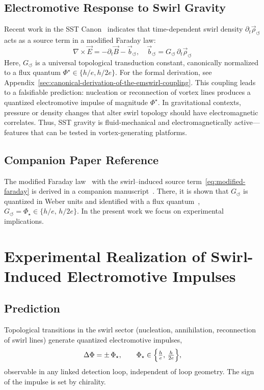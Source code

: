 \documentclass[11pt]{article}
\begin{document}
    \subsection{Electromotive Response to Swirl Gravity}
        Recent work in the SST Canon~\cite{Iskandarani2025EMG} indicates that time-dependent swirl density $\partial_t \vec{\rho}_{\circlearrowleft}$ acts as a source term in a modified Faraday law:
        \[
            \nabla \times \vec{E} = -\partial_t \vec{B} - \vec{b}_{\circlearrowleft}, \quad \vec{b}_{\circlearrowleft} = G_{\circlearrowleft} \, \partial_t \vec{\rho}_{\circlearrowleft}\label{eq:modified-faraday}
        \]
        Here, $G_{\circlearrowleft}$ is a universal topological transduction constant, canonically normalized to a flux quantum $\Phi^\star \in \{ h/e, h/2e \}$.
        For the formal derivation, see Appendix~\ref{sec:canonical-derivation-of-the-emswirl-coupling}.
        This coupling leads to a falsifiable prediction: nucleation or reconnection of vortex lines produces a quantized electromotive impulse of magnitude $\Phi^\star$. In gravitational contexts, pressure or density changes that alter swirl topology should have electromagnetic correlates. Thus, SST gravity is fluid-mechanical and electromagnetically active—features that can be tested in vortex-generating platforms.

    \subsection*{Companion Paper Reference}
        The modified Faraday law~\cite{Iskandarani2025EMG} with the swirl–induced source term~\eqref{eq:modified-faraday} is derived in a companion manuscript~\cite{Iskandarani2025EMG}. There, it is shown that $G_{\!\boldsymbol{\circlearrowleft}}$ is quantized in Weber units and identified with a flux quantum~\cite{DeaverFairbank1961,LittleParks1962}, $G_{\!\boldsymbol{\circlearrowleft}} = \Phi_\star \in \{h/e,\,h/2e\}$. In the present work we focus on experimental implications.


\section{Experimental Realization of Swirl-Induced Electromotive \mbox{Impulses}
}
\label{sec:exp-impulses}

    \subsection{Prediction}
    Topological transitions in the swirl sector (nucleation, annihilation, reconnection of swirl lines)
    generate quantized electromotive impulses,
    \begin{equation}
    \Delta\Phi = \pm\,\Phi_\star,
    \qquad
    \Phi_\star \in \Bigl\{ \tfrac{h}{e},\,\tfrac{h}{2e}\Bigr\},
    \end{equation}
    observable in any linked detection loop, independent of loop geometry. The sign of the impulse is set
    by chirality.
\end{document}
